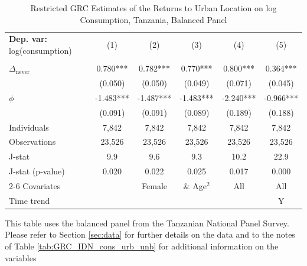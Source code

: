 \begin{table}[htb!] \centering \begin{threeparttable}
 \caption{Restricted GRC Estimates of the Returns to Urban Location on log Consumption, Tanzania, Balanced Panel} 
 \label{tab:GRC_TZA_cons_urb_bal} 
\begin{tabular}{l ccccc} \toprule  \textbf{Dep. var:}  log(consumption) 
                    &\multicolumn{1}{c}{(1)}   &\multicolumn{1}{c}{(2)}   &\multicolumn{1}{c}{(3)}   &\multicolumn{1}{c}{(4)}   &\multicolumn{1}{c}{(5)}   \\
                    &               &               &               &               &               \\
\addlinespace
$\Delta_{\text{never}}$&    0.780***&       0.782***&       0.770***&       0.800***&       0.364***\\
                    &     (0.050)   &     (0.050)   &     (0.049)   &     (0.071)   &     (0.045)   \\
\addlinespace
$\phi$              &      -1.483***&      -1.487***&      -1.483***&      -2.240***&      -0.966***\\
                    &     (0.091)   &     (0.091)   &     (0.089)   &     (0.189)   &     (0.188)   \\
\addlinespace
Individuals         &       7,842   &       7,842   &       7,842   &       7,842   &       7,842   \\
Observations        &      23,526   &      23,526   &      23,526   &      23,526   &      23,526   \\
J-stat              &         9.9   &         9.6   &         9.3   &        10.2   &        22.9   \\
J-stat (p-value)    &       0.020   &       0.022   &       0.025   &       0.017   &       0.000   \\
\cmidrule{2-6} Covariates & & Female & \& Age$^2$ & All & All  \\ Time trend & & & & & Y \\ \bottomrule \end{tabular} \begin{tablenotes} \footnotesize \item{This table uses the balanced panel from the Tanzanian National Panel Survey. Please refer to Section \ref{sec:data} for further details on the data and to the notes of Table \ref{tab:GRC_IDN_cons_urb_unb} for additional information on the variables 
}
\end{tablenotes}
\end{threeparttable}
\end{table}
